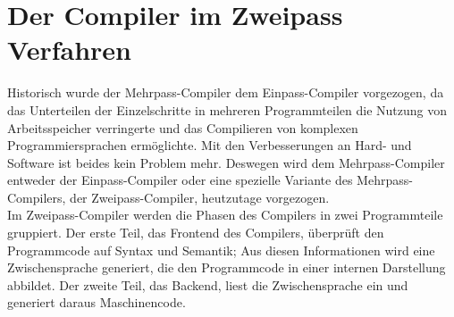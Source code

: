 \chapter{Der Compiler im Zweipass Verfahren}
\label{chap:theory:zweipassCompiler}

Historisch wurde der Mehrpass-Compiler dem Einpass-Compiler vorgezogen, da das Unterteilen der Einzelschritte in mehreren Programmteilen die Nutzung von Arbeitsspeicher verringerte und das Compilieren von komplexen Programmiersprachen ermöglichte.
Mit den Verbesserungen an Hard- und Software ist beides kein Problem mehr.
Deswegen wird dem Mehrpass-Compiler entweder der Einpass-Compiler oder eine spezielle Variante des Mehrpass-Compilers, der Zweipass-Compiler, heutzutage vorgezogen\cite{mossenbock:2024}.\\
Im Zweipass-Compiler werden die Phasen des Compilers in zwei Programmteile gruppiert.
Der erste Teil, das Frontend des Compilers, überprüft den Programmcode auf Syntax und Semantik;
Aus diesen Informationen wird eine Zwischensprache generiert, die den Programmcode in einer internen Darstellung abbildet.
Der zweite Teil, das Backend, liest die Zwischensprache ein und generiert daraus Maschinencode.\\

